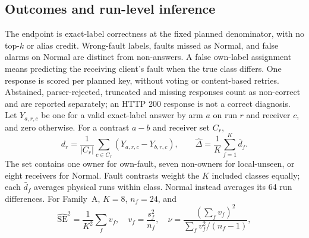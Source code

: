 \documentclass[conference]{IEEEtran}
\begin{document}
\subsection{Outcomes and run-level inference}
The endpoint is exact-label correctness at the fixed planned denominator, with no top-$k$ or alias credit. Wrong-fault labels, faults missed as Normal, and false alarms on Normal are distinct from non-answers. A false own-label assignment means predicting the receiving client's fault when the true class differs. One response is scored per planned key, without voting or content-based retries. Abstained, parser-rejected, truncated and missing responses count as non-correct and are reported separately; an HTTP 200 response is not a correct diagnosis. Let $Y_{a,r,c}$ be one for a valid exact-label answer by arm $a$ on run $r$ and receiver $c$, and zero otherwise. For a contrast $a-b$ and receiver set $C_r$,
\begin{equation}
d_r=\frac{1}{|C_r|}\sum_{c\in C_r}(Y_{a,r,c}-Y_{b,r,c}),\qquad
\widehat\Delta=\frac{1}{K}\sum_{f=1}^{K}\bar d_f.
\end{equation}
The set contains one owner for own-fault, seven non-owners for local-unseen, or eight receivers for Normal. Fault contrasts weight the $K$ included classes equally; each $\bar d_f$ averages physical runs within class. Normal instead averages its 64 run differences. For Family~A, $K=8$, $n_f=24$, and
\begin{equation}
\widehat{\mathrm{SE}}^2=\frac{1}{K^2}\sum_f v_f,\quad
v_f=\frac{s_f^2}{n_f},\quad
\nu=\frac{(\sum_f v_f)^2}{\sum_f v_f^2/(n_f-1)},
\end{equation}
\end{document}
